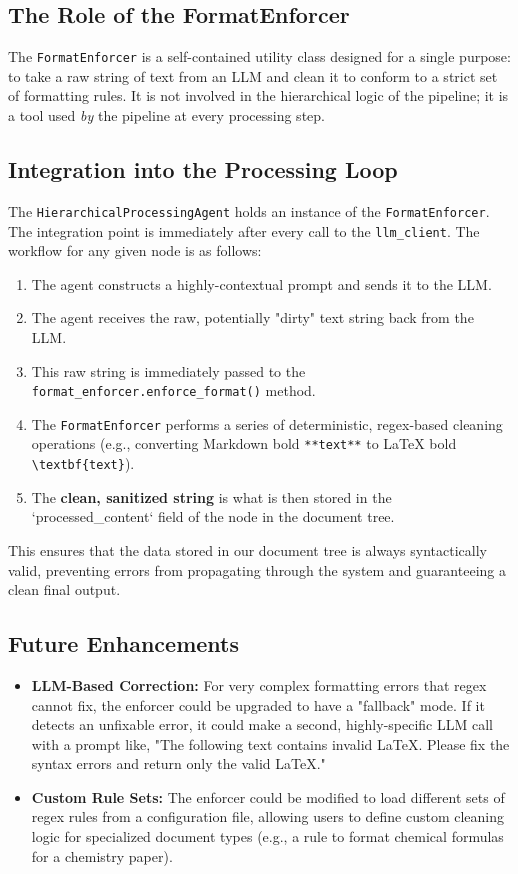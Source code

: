 \documentclass{article}
\begin{document}
\subsection{The Role of the FormatEnforcer}
The \texttt{FormatEnforcer} is a self-contained utility class designed for a single purpose: to take a raw string of text from an LLM and clean it to conform to a strict set of formatting rules. It is not involved in the hierarchical logic of the pipeline; it is a tool used \textit{by} the pipeline at every processing step.

\subsection{Integration into the Processing Loop}
The \texttt{HierarchicalProcessingAgent} holds an instance of the \texttt{FormatEnforcer}. The integration point is immediately after every call to the \texttt{llm\_client}. The workflow for any given node is as follows:
\begin{enumerate}
    \item The agent constructs a highly-contextual prompt and sends it to the LLM.
    \item The agent receives the raw, potentially "dirty" text string back from the LLM.
    \item This raw string is immediately passed to the \texttt{format\_enforcer.enforce\_format()} method.
    \item The \texttt{FormatEnforcer} performs a series of deterministic, regex-based cleaning operations (e.g., converting Markdown bold \texttt{**text**} to LaTeX bold \texttt{\textbackslash textbf\{text\}}).
    \item The \textbf{clean, sanitized string} is what is then stored in the `processed_content` field of the node in the document tree.
\end{enumerate}
This ensures that the data stored in our document tree is always syntactically valid, preventing errors from propagating through the system and guaranteeing a clean final output.

\subsection{Future Enhancements}
\begin{itemize}
    \item \textbf{LLM-Based Correction:} For very complex formatting errors that regex cannot fix, the enforcer could be upgraded to have a "fallback" mode. If it detects an unfixable error, it could make a second, highly-specific LLM call with a prompt like, "The following text contains invalid LaTeX. Please fix the syntax errors and return only the valid LaTeX."
    \item \textbf{Custom Rule Sets:} The enforcer could be modified to load different sets of regex rules from a configuration file, allowing users to define custom cleaning logic for specialized document types (e.g., a rule to format chemical formulas for a chemistry paper).
\end{itemize}
\end{document}

